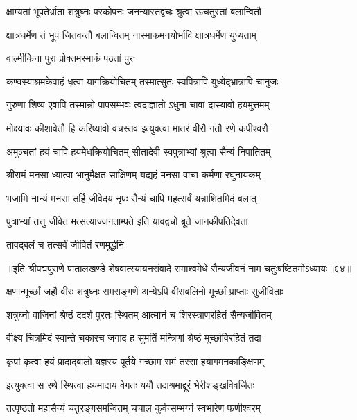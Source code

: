\twolineshloka
{क्षाम्यतां भूपतेर्भ्राता शत्रुघ्नः परकोपनः}
{जनन्यास्तद्वचः श्रुत्वा ऊचतुस्तां बलान्वितौ}%

\twolineshloka
{क्षात्रधर्मेण तं भूपं जितवन्तौ बलान्वितम्}
{नास्माकमनयोर्भावि क्षात्रधर्मेण युध्यताम्}%

\onelineshloka
{वाल्मीकिना पुरा प्रोक्तमस्माकं पठतां पुरः}%

\twolineshloka
{कण्वस्याश्रमकेवाहं धृत्वा यागक्रियोचितम्}
{तस्मात्सुतः स्वपित्रापि युध्येद्भ्रात्रापि चानुजः}%

\twolineshloka
{गुरुणा शिष्य एवापि तस्मान्नो पापसम्भवः}
{त्वदाज्ञातो ऽधुना चावां दास्यावो हयमुत्तमम्}%

\twolineshloka
{मोक्ष्यावः कीशावेतौ हि करिष्यावो वचस्तव}
{इत्युक्त्वा मातरं वीरौ गतौ रणे कपीश्वरौ}%

\twolineshloka
{अमुञ्चतां हयं चापि हयमेधक्रियोचितम्}
{सीतादेवी स्वपुत्राभ्यां श्रुत्वा सैन्यं निपातितम्}%

\twolineshloka
{श्रीरामं मनसा ध्यात्वा भानुमैक्षत साक्षिणम्}
{यद्यहं मनसा वाचा कर्मणा रघुनायकम्}%

\twolineshloka
{भजामि नान्यं मनसा तर्हि जीवेदयं नृपः}
{सैन्यं चापि महत्सर्वं यन्नाशितमिदं बलात्}%

\twolineshloka
{पुत्राभ्यां तत्तु जीवेत मत्सत्याज्जगताम्पते}
{इति यावद्वचो ब्रूते जानकीपतिदेवता}%

\onelineshloka
{तावद्बलं च तत्सर्वं जीवितं रणमूर्द्धनि}%

{॥इति श्रीपद्मपुराणे पातालखण्डे शेषवात्स्यायनसंवादे रामाश्वमेधे सैन्यजीवनं नाम चतुःषष्टितमोऽध्यायः॥६४॥}



\twolineshloka
{क्षणान्मूर्च्छां जहौ वीरः शत्रुघ्नः समराङ्गणे}
{अन्येऽपि वीराबलिनो मूर्च्छां प्राप्ताः सुजीविताः}%

\twolineshloka
{शत्रुघ्नो वाजिनां श्रेष्ठं ददर्श पुरतः स्थितम्}
{आत्मानं च शिरस्त्राणरहितं सैन्यजीवितम्}%

\twolineshloka
{वीक्ष्य चित्रमिदं स्वान्ते चकारच जगाद ह}
{सुमतिं मन्त्रिणां श्रेष्ठं मूर्च्छाविरहितं तदा}%

\twolineshloka
{कृपां कृत्वा हयं प्रादाद्बालो यज्ञस्य पूर्तये}
{गच्छाम रामं तरसा हयागमनकाङ्क्षिणम्}%

\twolineshloka
{इत्युक्त्वा स रथे स्थित्वा हयमादाय वेगतः}
{ययौ तदाश्रमाद्दूरं भेरीशङ्खविवर्जितः}%

\twolineshloka
{तत्पृष्ठतो महासैन्यं चतुरङ्गसमन्वितम्}
{चचाल कुर्वन्सम्भग्नं स्वभारेण फणीश्वरम्}%

